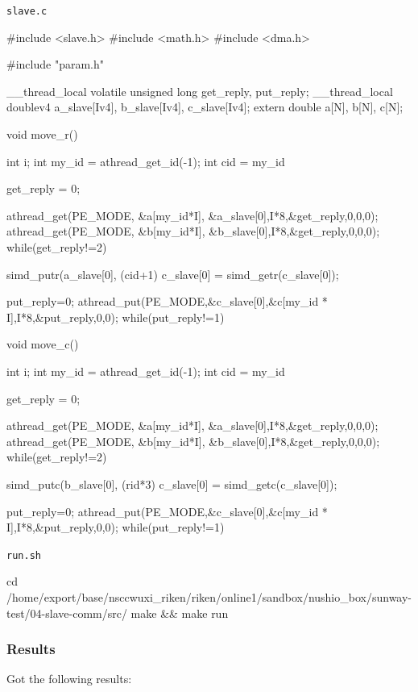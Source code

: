 \verb`slave.c`
\begin{code}
#include <slave.h>
#include <math.h>
#include <dma.h>

#include "param.h"

__thread_local volatile unsigned long get_reply, put_reply;
__thread_local doublev4 a_slave[Iv4], b_slave[Iv4], c_slave[Iv4];
extern double a[N], b[N], c[N];

void move_r() {
  int i;
  int my_id = athread_get_id(-1);
  int cid = my_id%

  get_reply = 0;

  athread_get(PE_MODE, &a[my_id*I], &a_slave[0],I*8,&get_reply,0,0,0);
  athread_get(PE_MODE, &b[my_id*I], &b_slave[0],I*8,&get_reply,0,0,0);
  while(get_reply!=2) {}

  simd_putr(a_slave[0], (cid+1)%
  c_slave[0] = simd_getr(c_slave[0]);

  put_reply=0;
  athread_put(PE_MODE,&c_slave[0],&c[my_id * I],I*8,&put_reply,0,0);
  while(put_reply!=1) {}

}

void move_c() {
  int i;
  int my_id = athread_get_id(-1);
  int cid = my_id%

  get_reply = 0;

  athread_get(PE_MODE, &a[my_id*I], &a_slave[0],I*8,&get_reply,0,0,0);
  athread_get(PE_MODE, &b[my_id*I], &b_slave[0],I*8,&get_reply,0,0,0);
  while(get_reply!=2) {}

  simd_putc(b_slave[0], (rid*3)%
  c_slave[0] = simd_getc(c_slave[0]);

  put_reply=0;
  athread_put(PE_MODE,&c_slave[0],&c[my_id * I],I*8,&put_reply,0,0);
  while(put_reply!=1) {}

}

\end{code}

\verb`run.sh`
\begin{code}

cd /home/export/base/nsccwuxi_riken/riken/online1/sandbox/nushio_box/sunway-test/04-slave-comm/src/
make && make run
    
\end{code}

\subsubsection{Results}

Got the following results:

